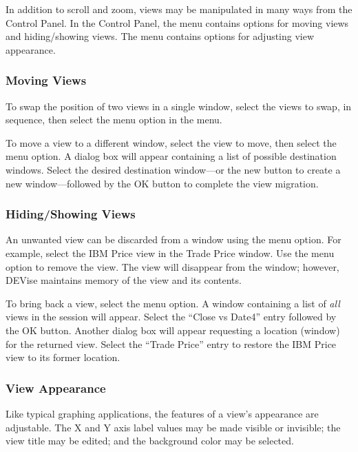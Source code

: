 In addition to scroll and zoom, views may be manipulated in many ways from the
Control Panel. In the Control Panel, the  menu contains options for
moving views and hiding/showing views. The  menu contains options
for adjusting view appearance.

\subsubsection{Moving Views}

To swap the position of two views in a single window, select the views to
swap, in sequence, then select the  menu option in the
 menu.

To move a view to a different window, select the view to move, then select the
 menu option. A dialog box will appear containing a list of
possible destination windows. Select the desired destination window---or the new
button to create a new window---followed by the OK button to complete the view
migration.

\subsubsection{Hiding/Showing Views}

An unwanted view can be discarded from a window using the 
menu option. For example, select the IBM Price view in the Trade Price
window. Use the  menu option to remove the view. The view will
disappear from the window; however, DEVise maintains memory of the view and its
contents.

To bring back a view, select the  menu option. A window
containing a list of {\em all} views in the session will appear. Select the
``Close vs Date4'' entry followed by the OK button. Another dialog box will
appear requesting a location (window) for the returned view. Select the ``Trade
Price'' entry to restore the IBM Price view to its former location.

\subsubsection{View Appearance}

Like typical graphing applications, the features of a view's appearance are
adjustable. The X and Y axis label values may be made visible or invisible;
the view title may be edited; and the background color may be selected.

